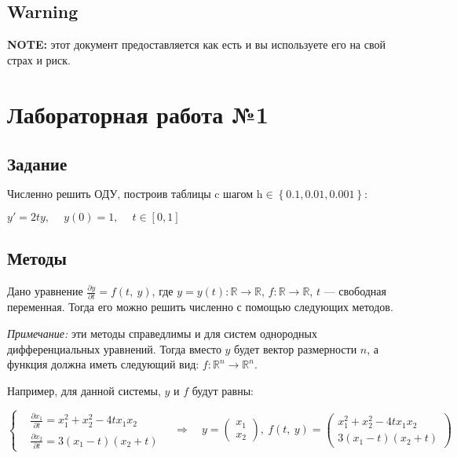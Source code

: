 \documentclass[12pt, a4paper]{article}
\begin{document}
\subsection{Warning}

\textbf{NOTE:} этот документ предоставляется как есть и вы используете его на свой страх и риск.


\section{Лабораторная работа №1}

\subsection{Задание}
$ \text{Численно решить ОДУ, построив таблицы c шагом h} \in \left\{ 0.1, 0.01, 0.001 \right\} : $

$ y' = 2ty,\ \quad y(0) = 1,\ \quad t \in [0,1] $

\subsection{Методы}

Дано уравнение $\frac{\partial y}{\partial t} = f(t,\ y)$, где $y = y(t) : \mathbb{R}\to \mathbb{R}$, $f : \mathbb{R}\to \mathbb{R}$, $t$ --- свободная переменная. Тогда его можно решить численно с помощью следующих методов.

\textit{Примечание:} эти методы справедлимы и для систем однородных дифференциальных уравнений. Тогда вместо $y$ будет вектор размерности $n$, а функция должна иметь следующий вид: $f: \mathbb{R}^n\to \mathbb{R}^n$.

Например, для данной системы, $y$ и $f$ будут равны:

$$ \left\{
\begin{aligned}
&\frac{\partial x_1}{\partial t} = x_1^2 + x_2^2 - 4 t x_1 x_2  \\
&\frac{\partial x_2}{\partial t} = 3(x_1-t)(x_2+t) 
\end{aligned}
\right.\quad\Rightarrow\quad y = \begin{pmatrix}x_1\\ x_2 \end{pmatrix},\ f(t,\ y) = 
\begin{pmatrix}
x_1^2 + x_2^2 - 4 t x_1 x_2  \\
3(x_1-t)(x_2+t) 
\end{pmatrix} $$
\end{document}
